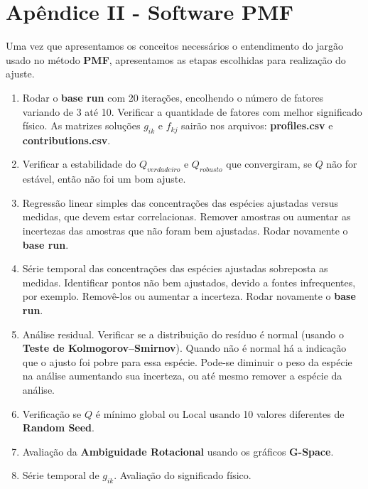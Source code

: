 \section{Apêndice II - Software PMF}

Uma vez que apresentamos os conceitos necessários o entendimento do jargão 
usado no método \textbf{PMF}, apresentamos as etapas escolhidas para realização 
do ajuste.

\begin{enumerate}
  \item Rodar o \textbf{base run} com 20 iterações, encolhendo o número de 
        fatores variando de 3 até 10. 
        Verificar a quantidade de fatores com melhor significado físico. 
        As matrizes soluções $g_{ik}$ e $f_{kj}$ sairão nos arquivos: 
        \textbf{profiles.csv} e \textbf{contributions.csv}.
  \item Verificar a estabilidade do $Q_{verdadeiro}$ e $Q_{robusto}$ que 
        convergiram, se $Q$ não for estável, então não foi um bom ajuste.
  \item Regressão linear simples das concentrações das espécies ajustadas 
        versus medidas, que devem estar correlacionas. 
        Remover amostras ou aumentar as incertezas das amostras que não foram 
        bem ajustadas. Rodar novamente o \textbf{base run}.  
  \item Série temporal das concentrações das espécies ajustadas sobreposta
        as medidas. 
        Identificar pontos não bem ajustados, devido a fontes infrequentes, 
        por exemplo.
        Removê-los ou aumentar a incerteza. Rodar novamente o \textbf{base run}.
  \item Análise residual. Verificar se a distribuição do resíduo é normal 
        (usando o \textbf{Teste de Kolmogorov–Smirnov}). 
        Quando não é normal há a indicação que o ajusto foi pobre para essa 
        espécie. 
        Pode-se diminuir o peso da espécie na análise aumentando sua incerteza, 
        ou até mesmo remover a espécie da análise.
  \item Verificação se $Q$ é mínimo global ou Local usando 10 valores 
        diferentes de \textbf{Random Seed}.
  \item Avaliação da \textbf{Ambiguidade Rotacional} usando os 
        gráficos \textbf{G-Space}.
  \item Série temporal de $g_{ik}$. Avaliação do significado físico.
\end{enumerate}
